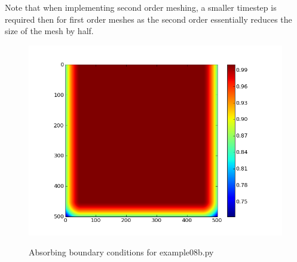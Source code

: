 Note that when implementing second order meshing, a smaller timestep is required
then for first order meshes as the second order essentially reduces the size of
the mesh by half.

\begin{figure}[ht]
 \centering
 \includegraphics[width=5in]{figures/ex08babc.png}
 \label{fig:abconds}
 \caption{Absorbing boundary conditions for example08b.py}
\end{figure}

